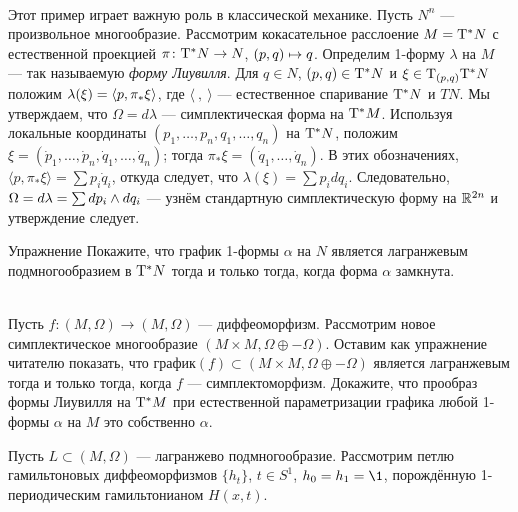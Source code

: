 \begin{ex}{}\label{3.1.C}\\ 
Этот пример играет важную роль в классической механике.
Пусть $N^n$ --- произвольное многообразие.
Рассмотрим кокасательное расслоение $M = \mathrm{T}^\ast N$ с естественной
проекцией $\pi\colon \mathrm{T}^\ast N \to N$, $(p, q) \z\mapsto q$.
Определим 1-форму $\lambda$ на $M$ --- так называемую \emph{форму Лиувилля}.
Для $q \in N$, $(p, q) \in \mathrm{T}^\ast N$ и $\xi \in \mathrm{T}_{(p, q)} \mathrm{T}^\ast N$ положим $\lambda (\xi) \z= \langle p, \pi_\ast \xi \rangle$, где $\langle\ ,\ \rangle$ --- естественное спаривание $\mathrm{T}^\ast N$ и $TN$.
Мы утверждаем, что $\Omega = d\lambda$ --- симплектическая форма на $\mathrm{T}^\ast M$.
Используя локальные координаты $(p_1,\dots, p_n, q_1,\dots, q_n)$ на $\mathrm{T}^\ast N$, положим $\xi = (\dot p_1 ,\dots, \dot p_n, \dot q_1,\dots,\dot q_n)$;
тогда $\pi_\ast \xi = (\dot q_1,\dots, \dot q_n)$.
В этих обозначениях, $\langle p, \pi_\ast \xi\rangle=\sum p_i \dot q_i$, откуда следует, что $\lambda (\xi) =\sum p_i dq_i$.
Следовательно, $\Omega = d\lambda =\sum dp_i \z\wedge dq_i$ --- узнём стандартную симплектическую форму на $\mathbb{R}^{2n}$ и утверждение следует.
\end{ex}


\begin{ex*}{Упражнение}\label{1-form-lagrange}
Покажите, что график 1-формы $\alpha$ на $N$ является лагранжевым подмногообразием в $\mathrm{T}^\ast N$ тогда и только тогда, когда форма $\alpha$ замкнута.
\end{ex*}


\begin{ex}{}\label{3.1.D}\\ 
Пусть $f\colon (M, \Omega) \to (M, \Omega)$ --- диффеоморфизм.
Рассмотрим новое симплектическое многообразие $(M \times M, \Omega \oplus -\Omega)$.
Оставим как упражнение читателю показать, что график$(f) \subset (M \times M, \Omega \oplus -\Omega)$ является лагранжевым тогда и только тогда, когда $f$ --- симплектоморфизм.
 Докажите, что прообраз формы Лиувилля на $\mathrm{T}^\ast M$ при естественной параметризации графика любой 1-формы $\alpha$ на $M$ это собственно $\alpha$.
\end{ex}

\begin{ex}{}\label{3.1.E}
Пусть $L\subset(M,\Omega)$ --- лагранжево подмногообразие.
Рассмотрим петлю гамильтоновых диффеоморфизмов $\{h_t\}$, $t\in S^1$, $h_0=h_1=\1$, порождённую 1-периодическим гамильтонианом $H(x,t)$.
\end{ex}

